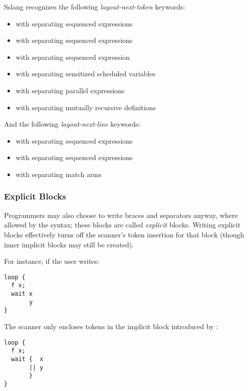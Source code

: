 \documentclass{article}
\begin{document}
Sslang recognizes the following \emph{layout-next-token} keywords:

\begin{itemize}
  \item {} with \lit*{;} separating sequenced expressions
  \item \lit*{=} with \lit*{;} separating sequenced expressions
  \item {} with \lit*{;} separating sequenced expression
  \item {} with \lit*{||} separating sensitized scheduled variables
  \item {} with \lit*{||} separating parallel expressions
  \item {} with \lit*{||} separating mutually recursive definitions
\end{itemize}

And the following \emph{layout-next-line} keywords:

\begin{itemize}
  \item {} with \lit*{;} separating sequenced expressions
  \item {} with \lit*{;} separating sequenced expressions
  \item {} with \lit*{|} separating match arms
\end{itemize}

\subsubsection{Explicit Blocks}

Programmers may also choose to write braces and separators anyway,
where allowed by the syntax; these blocks are called \emph{explicit} blocks.
Writing explicit blocks effectively turns off the scanner's token insertion for
that block (though inner implicit blocks may still be created).

For instance, if the user writes:

\begin{lstlisting}
loop {
  f x;
  wait x
       y
}
\end{lstlisting}

The scanner only encloses tokens in the implicit block introduced by :

\begin{lstlisting}
loop {
  f x;
  wait {  x
       || y
       }
}
\end{lstlisting}
\end{document}
